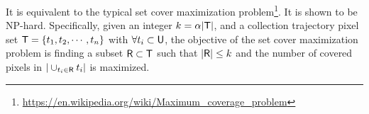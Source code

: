 It is equivalent to the typical set cover maximization problem\footnote{\url{https://en.wikipedia.org/wiki/Maximum\_coverage\_problem}}.
It is shown to be NP-hard.
Specifically, given an integer $k = \alpha |\mathsf{T}|$, and a collection trajectory pixel set $\mathsf{T} = \{t_1, t_2, \cdots, t_n \}$ with $\forall t_i \subset \mathsf{U}$,
the objective of the set cover maximization problem is finding a subset $\mathsf{R} \subset \mathsf{T}$ such that $|\mathsf{R}| \leq k$ and the number of covered pixels in $|\cup_{t_i \in \mathsf{R}} t_i|$ is maximized.





